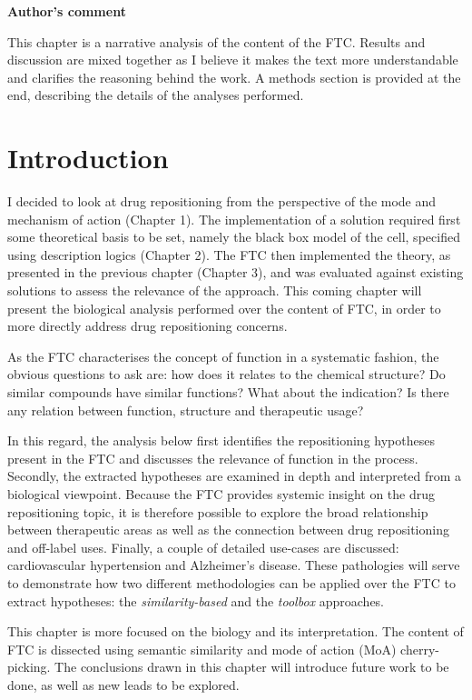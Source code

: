 \textbf{Author's comment}

This chapter is a narrative analysis of the content of the FTC. Results and discussion are mixed together as I believe it makes the text more understandable and clarifies the reasoning behind the work. A methods section is provided at the end, describing the details of the analyses performed.

\hrulefill

\section{Introduction}
I decided to look at drug repositioning from the perspective of the mode and mechanism of action (Chapter 1). The implementation of a solution required first some theoretical basis to be set, namely the black box model of the cell, specified using description logics (Chapter 2). The FTC then implemented the theory, as presented in the previous chapter (Chapter 3), and was evaluated against existing solutions to assess the relevance of the approach. This coming chapter will present the biological analysis performed over the content of FTC, in order to more directly address drug repositioning concerns.

As the FTC characterises the concept of function in a systematic fashion, the obvious questions to ask are: how does it relates to the chemical structure? Do similar compounds have similar functions? What about the indication? Is there any relation between function, structure and therapeutic usage?

In this regard, the analysis below first identifies the repositioning hypotheses present in the FTC and discusses the relevance of function in the process. Secondly, the extracted hypotheses are examined in depth and interpreted from a biological viewpoint. Because the FTC provides systemic insight on the drug repositioning topic, it is therefore possible to explore the broad relationship between therapeutic areas as well as the connection between drug repositioning and off-label uses. Finally, a couple of detailed use-cases are discussed: cardiovascular hypertension and Alzheimer's disease. These pathologies will serve to demonstrate how two different methodologies can be applied over the FTC to extract hypotheses: the \emph{similarity-based} and the \emph{toolbox} approaches.

This chapter is more focused on the biology and its interpretation. The content of FTC is dissected using semantic similarity and mode of action (MoA) cherry-picking. The conclusions drawn in this chapter will introduce future work to be done, as well as new leads to be explored.

